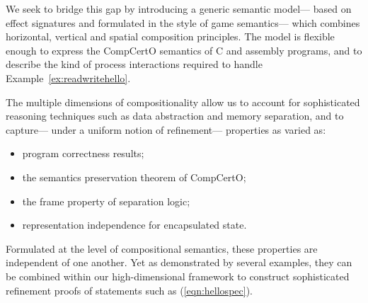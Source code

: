 \documentclass[acmsmall,screen,review,anonymous,nonacm]{acmart}
\begin{document}
We seek to bridge this gap
by introducing a generic semantic model---%
based on effect signatures and formulated in the style of game semantics---%
which combines horizontal, vertical and spatial composition principles.
The model is flexible enough
to express the CompCertO semantics of C and assembly programs,
and to describe the kind of process interactions %
required to handle Example~\ref{ex:readwritehello}.

The multiple dimensions of compositionality
allow us to account for sophisticated reasoning techniques
such as data abstraction and memory separation,
and to capture---%
under a uniform notion of refinement---%
properties as varied as:
\begin{itemize}
  \item program correctness results;
  \item the semantics preservation theorem of CompCertO;
  \item the frame property of separation logic;
  \item representation independence for encapsulated state.
\end{itemize}
Formulated at the level of compositional semantics,
these properties are independent of one another.
Yet as demonstrated by several examples,
they can be combined within our high-dimensional framework
to construct sophisticated refinement proofs
of statements such as (\ref{eqn:hellospec}).
\end{document}
